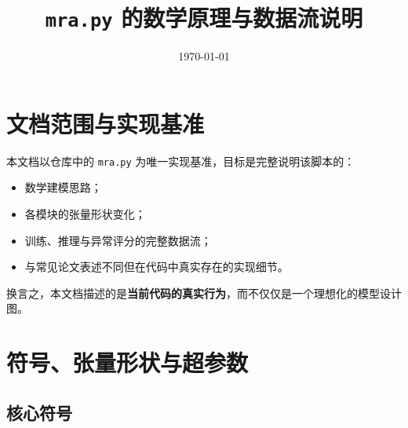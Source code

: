 \documentclass[UTF8]{ctexart}
\title{\texttt{mra.py} 的数学原理与数据流说明}
\author{}
\date{\today}
\begin{document}
\maketitle
\tableofcontents
\newpage

\section{文档范围与实现基准}

本文档以仓库中的 \texttt{mra.py} 为唯一实现基准，目标是完整说明该脚本的：
\begin{itemize}
    \item 数学建模思路；
    \item 各模块的张量形状变化；
    \item 训练、推理与异常评分的完整数据流；
    \item 与常见论文表述不同但在代码中真实存在的实现细节。
\end{itemize}

换言之，本文档描述的是\textbf{当前代码的真实行为}，而不仅仅是一个理想化的模型设计图。

\section{符号、张量形状与超参数}

\subsection{核心符号}
\end{document}
